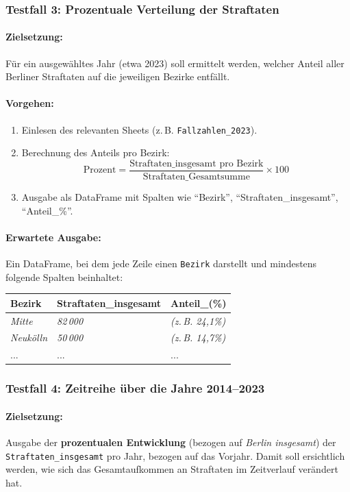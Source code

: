 \documentclass[11pt,a4paper]{article}
\begin{document}
\subsubsection{Testfall 3: Prozentuale Verteilung der Straftaten}
\paragraph{Zielsetzung:}
Für ein ausgewähltes Jahr (etwa 2023) soll ermittelt werden, welcher Anteil aller Berliner Straftaten auf die jeweiligen Bezirke entfällt.

\paragraph{Vorgehen:}
\begin{enumerate}
    \item Einlesen des relevanten Sheets (z.\,B. \texttt{Fallzahlen\_2023}).
    \item Berechnung des Anteils pro Bezirk: 
    \[
       \text{Prozent} = \frac{\text{Straftaten\_insgesamt pro Bezirk}}{\text{Straftaten\_Gesamtsumme}} \times 100 
    \]
    \item Ausgabe als DataFrame mit Spalten wie \enquote{Bezirk}, \enquote{Straftaten\_insgesamt}, \enquote{Anteil\_\%}.
\end{enumerate}

\paragraph{Erwartete Ausgabe:}
Ein DataFrame, bei dem jede Zeile einen \texttt{Bezirk} darstellt und mindestens folgende Spalten beinhaltet:
\begin{center}
\begin{tabular}{l|l|l}
\textbf{Bezirk} & \textbf{Straftaten\_insgesamt} & \textbf{Anteil\_(\%)} \\
\hline
\textit{Mitte} & \textit{82\,000} & \textit{(z.\,B. 24,1\%)} \\
\textit{Neukölln} & \textit{50\,000} & \textit{(z.\,B. 14,7\%)} \\
... & ... & ...
\end{tabular}
\end{center}

\subsubsection{Testfall 4: Zeitreihe über die Jahre 2014--2023}
\paragraph{Zielsetzung:}
Ausgabe der \textbf{prozentualen Entwicklung} (bezogen auf \emph{Berlin insgesamt}) der \texttt{Straftaten\_insgesamt} pro Jahr, bezogen auf das Vorjahr. Damit soll ersichtlich werden, wie sich das Gesamtaufkommen an Straftaten im Zeitverlauf verändert hat. 
\end{document}
